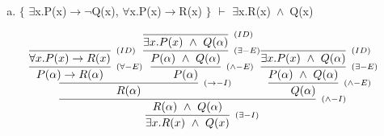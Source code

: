 \documentclass[aspectratio=43]{beamer}
\newcommand{\ria}{$\rightarrow$}
\newcommand{\fall}{$\forall$}
\newcommand{\ex}{$\exists$}
\newcommand{\nao}{$\neg$}
\newcommand{\andd}{$\wedge$}
\begin{document}
    \begin{frame}[fragile]
    
    	\begin{enumerate}[d)]
			\item $\{$ \ex x.P(x)\ria \nao Q(x), \fall x.P(x)\ria R(x) $\}$ $\vdash$ \ex x.R(x)\ \andd\ Q(x) \\
		\end{enumerate}
        
        \vspace{50pt}
        
        \[
        \begin{array}{c}
		
        	\infer[_{(\exists -I)}]
            	{\exists  x. R(x)\ \land\ Q(x)}
            	{\infer[_{(\land -I)}] 
                	{R(\alpha)\ \land\ Q(\alpha)}
                	{\infer[_{(\to -I)}]
            			{R(\alpha)}
            			{\infer[_{(\forall -E)}]
                			{P(\alpha) \rightarrow R(\alpha)} 
                    		{\infer[_{(ID)}]
                    			{\forall x.P(x)\to R(x)}
                    			{}
                    		}  
                		\infer[_{(\land -E)}] 
                			{P(\alpha)}
                    		{\infer[_{(\exists -E)}]
                    			{P(\alpha)\ \land \ Q(\alpha)}
                    			{\infer[_{(ID)}]
                        			{\exists x.P(x)\ \land \ Q(\alpha)}
                            		{}
                        		}
                    		}
                		}
                     \infer[_{(\land -E)}] 
                		{Q(\alpha)}
                    	{\infer[_{(\exists -E)}]
                    		{P(\alpha)\ \land \ Q(\alpha)}
                    		{\infer[_{(ID)}]
                        		{\exists x.P(x)\ \land \ Q(\alpha)}
                            	{}
                        	}
                    	}
                    }
                }
        
		\end{array}
        \]
        
	\end{frame}
    
\end{document}
